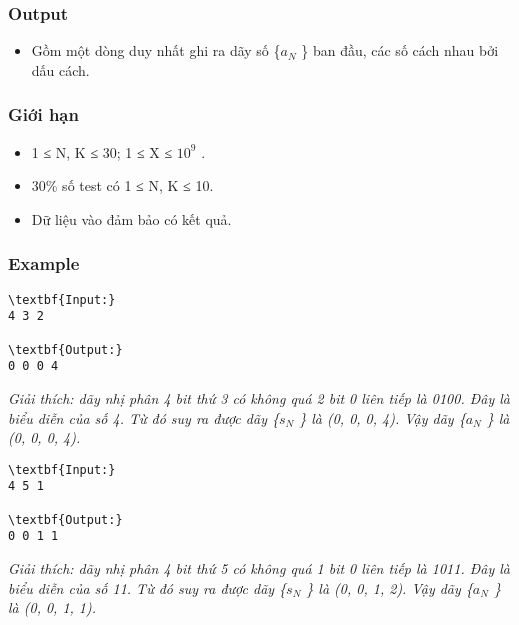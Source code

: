 \subsubsection{   Output  }
\begin{itemize}
	\item     Gồm một dòng duy nhất ghi ra dãy số \{$a_{N}$    \} ban đầu, các số cách nhau bởi dấu cách.   
\end{itemize}

\subsubsection{   Giới hạn  }
\begin{itemize}
	\item     1 ≤ N, K ≤ 30; 1 ≤ X ≤ $10^{9}$    .   
	\item     30\% số test có 1 ≤ N, K ≤ 10.   
	\item     Dữ liệu vào đảm bảo có kết quả.   
\end{itemize}

\subsubsection{   Example  }
\begin{verbatim}
\textbf{Input:}
4 3 2

\textbf{Output:}
0 0 0 4\end{verbatim}

\emph{    Giải thích: dãy nhị phân 4 bit thứ 3 có không quá 2 bit 0 liên tiếp là 0100. Đây là biểu diễn của số 4. Từ đó suy ra được dãy \{$s_{N}$    \} là (0, 0, 0, 4). Vậy dãy \{$a_{N}$    \} là (0, 0, 0, 4).   }
\begin{verbatim}
\textbf{Input:}
4 5 1

\textbf{Output:}
0 0 1 1\end{verbatim}

\emph{    Giải thích: dãy nhị phân 4 bit thứ 5 có không  quá 1 bit 0 liên tiếp là 1011. Đây là biểu diễn của số 11. Từ đó suy ra  được dãy \{$s_{N}$    \} là (0, 0, 1, 2). Vậy dãy \{$a_{N}$    \} là (0, 0, 1, 1).   }
